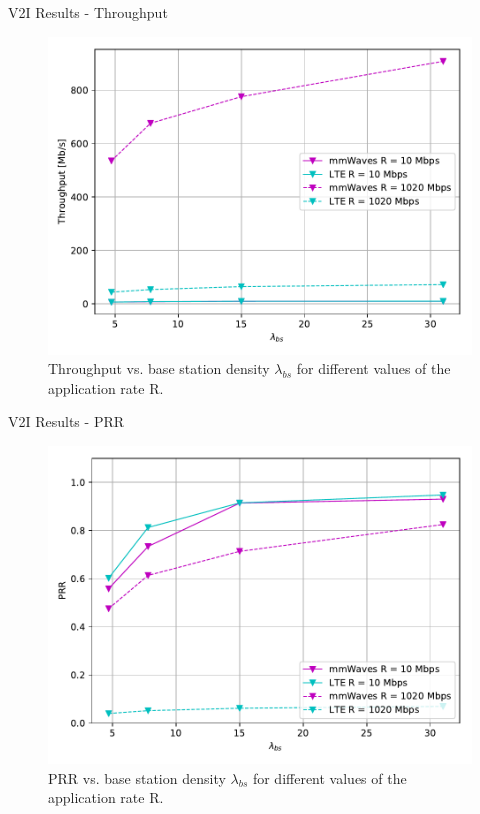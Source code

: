 \documentclass{beamer}
\begin{document}
	\begin{frame}{V2I Results - Throughput}
		\begin{figure}
			\includegraphics[scale=0.5]{throughput_random_lambda_bs_lte_mmwave_UDP}
			\caption{Throughput vs. base station density $\lambda_{bs}$ for different values of the application rate R.}
		\end{figure}
	\end{frame}

	\begin{frame}{V2I Results - PRR}
		\begin{figure}
			\includegraphics[scale=0.5]{PRR_random_lambda_bs_lte_mmwave_UDP}
			\caption{PRR vs. base station density $\lambda_{bs}$ for different values of the application rate R.}
		\end{figure}
	\end{frame}
\end{document}
